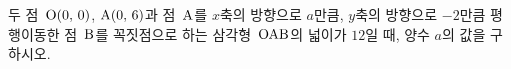 두 점~$\mathrm{O}(0,\mkern3mu 0)$, $\mathrm{A}(0,\mkern3mu 6)$과 점~$\mathrm{A}$를 $x$축의 방향으로 $a$만큼, $y$축의 방향으로 $-2$만큼 평행이동한 점~$\mathrm{B}$를 꼭짓점으로 하는 삼각형~$\mathrm{OAB}$의 넓이가 $12$일 때, 양수 $a$의 값을 구하시오.

